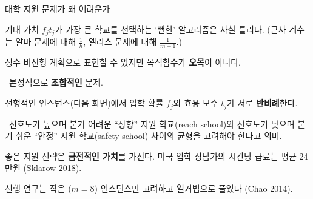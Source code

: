 \documentclass[10pt,slidestop,compress,mathserif,notheorems]{beamer}
\newif\ifen
\theoremstyle{definition}
\theoremstyle{definition}
\begin{document}
\begin{frame}{\ifen Why college application is difficult\else 대학 지원 문제가 왜 어려운가\fi}
\ifen
``Obvious'' algorithm which picks the schools having highest expected value $f_j t_j$ is \textbf{incorrect.} ($\tfrac{1}{h}$-opt. for Alma’s problem; $\tfrac{1}{m-1}$-opt. for Ellis’s problem.)

College application can be expressed as a nonlinear integer program, but it is \textbf{not concave}.

\textrightarrow~Problem is \textbf{combinatorial} in nature.
￣
Typical instances (see following slide) involve \textbf{negative correlation} between probabilities $f_j$ and utility values $t_j$. 

\textrightarrow~Students must trade off attractive, selective “reach schools” against less preferable “safety schools” where admission is a safer bet.

A good application strategy has \textbf{monetary value}. US admissions consultants charge an average of \$200/hr (Sklarow 2018).  

Previous research considered small ($m=8$) instances and solved by enumeration (Chao 2014).
\else
기대 가치 $f_j t_j$가 가장 큰 학교를 선택하는 `뻔한' 알고리즘은 사실 틀리다. (근사 계수는 알마 문제에 대해 $\tfrac{1}{h}$, 엘리스 문제에 대해 $\tfrac{1}{m-1}$.)

정수 비선형 계획으로 표현할 수 있지만 목적함수가 \textbf{오목}이 아니다.

\textrightarrow~본성적으로 \textbf{조합적인} 문제.



전형적인 인스턴스(다음 화면)에서 입학 확률 $f_j$와 효용 모수 $t_j$가 서로 \textbf{반비례}한다.

\textrightarrow~선호도가 높으며 붙기 어려운 “상향” 지원 학교(reach school)와 선호도가 낮으며 붙기 쉬운 “안정” 지원 학교(safety school) 사이의 균형을 고려해야 한다고 의미.

좋은 지원 전략은 \textbf{금전적인 가치}를 가진다. 미국 입학 상담가의 시간당 급료는 평균 24만원 (Sklarow 2018).

선행 연구는 작은 ($m=8$) 인스턴스만 고려하고 열거법으로 풀었다 (Chao 2014).
\fi
\end{frame}
\end{document}
